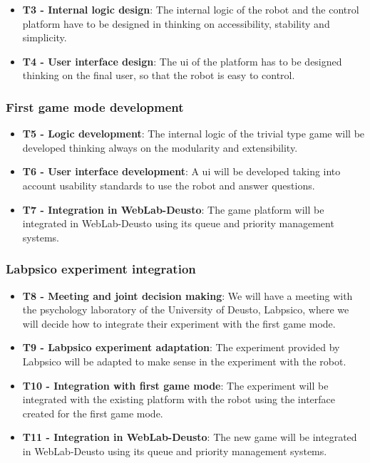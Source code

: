 \begin{itemize}
\item \textbf{T3 - Internal logic design}: The internal logic of the robot and the control platform
have to be designed in thinking on accessibility, stability and simplicity.

\item \textbf{T4 - User interface design}: The \acrlong{ui} of the platform has to be designed
thinking on the final user, so that the robot is easy to control.
\end{itemize}

\subsubsection{First game mode development}

\begin{itemize}
\item \textbf{T5 - Logic development}: The internal logic of the trivial type game will be developed
thinking always on the modularity and extensibility.

\item \textbf{T6 - User interface development}: A \acrlong{ui} will be developed taking into account
usability standards to use the robot and answer questions.

\item \textbf{T7 - Integration in WebLab-Deusto}: The game platform will be integrated in
WebLab-Deusto using its queue and priority management systems.
\end{itemize}

\subsubsection{Labpsico experiment integration}

\begin{itemize}
\item \textbf{T8 - Meeting and joint decision making}: We will have a meeting with the psychology
laboratory of the University of Deusto, Labpsico, where we will decide how to integrate their
experiment with the first game mode.

\item \textbf{T9 - Labpsico experiment adaptation}: The experiment provided by Labpsico will be
adapted to make sense in the experiment with the robot.

\item \textbf{T10 - Integration with first game mode}: The experiment will be integrated with the
existing platform with the robot using the interface created for the first game mode.

\item \textbf{T11 - Integration in WebLab-Deusto}: The new game will be integrated in WebLab-Deusto
using its queue and priority management systems.
\end{itemize}

